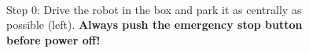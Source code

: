 \begin{figure}[h!]
\centering
\mbox{\quad
{}}
\caption{Step 0: Drive the robot in the box and park it as centrally as possible (left). {\bf Always push the emergency stop button before power off!}} %
\end{figure}

